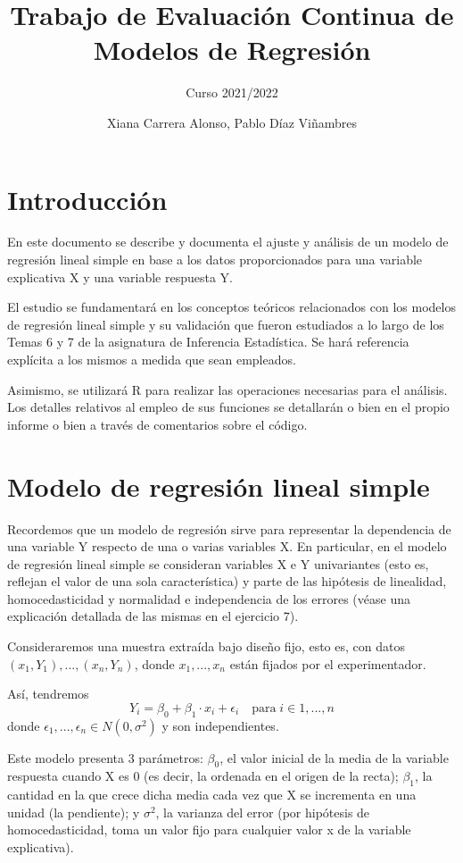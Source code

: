 \documentclass[
]{article}
\title{Trabajo de Evaluación Continua de Modelos de Regresión}
\subtitle{Curso 2021/2022}
\author{Xiana Carrera Alonso, Pablo Díaz Viñambres}
\date{}
\begin{document}
\maketitle

\hypertarget{introducciuxf3n}{%
\section{Introducción}\label{introducciuxf3n}}

En este documento se describe y documenta el ajuste y análisis de un
modelo de regresión lineal simple en base a los datos proporcionados
para una variable explicativa X y una variable respuesta Y.

El estudio se fundamentará en los conceptos teóricos relacionados con
los modelos de regresión lineal simple y su validación que fueron
estudiados a lo largo de los Temas 6 y 7 de la asignatura de Inferencia
Estadística. Se hará referencia explícita a los mismos a medida que sean
empleados.

Asimismo, se utilizará R para realizar las operaciones necesarias para
el análisis. Los detalles relativos al empleo de sus funciones se
detallarán o bien en el propio informe o bien a través de comentarios
sobre el código.

\hypertarget{modelo-de-regresiuxf3n-lineal-simple}{%
\section{Modelo de regresión lineal
simple}\label{modelo-de-regresiuxf3n-lineal-simple}}

Recordemos que un modelo de regresión sirve para representar la
dependencia de una variable Y respecto de una o varias variables X. En
particular, en el modelo de regresión lineal simple se consideran
variables X e Y univariantes (esto es, reflejan el valor de una sola
característica) y parte de las hipótesis de linealidad, homocedasticidad
y normalidad e independencia de los errores (véase una explicación
detallada de las mismas en el ejercicio 7).

Consideraremos una muestra extraída bajo diseño fijo, esto es, con datos
\((x_1, Y_1), ..., (x_n, Y_n)\), donde \(x_1, ..., x_n\) están fijados
por el experimentador.

Así, tendremos \[
Y_i = \beta_0 + \beta_1 \cdot x_i + \epsilon_i  \quad \text{para}\; i \in {1,...,n}
\] donde \(\epsilon_1,...,\epsilon_n \in N(0, \sigma^2)\) y son
independientes.

Este modelo presenta 3 parámetros: \(\beta_0\), el valor inicial de la
media de la variable respuesta cuando X es 0 (es decir, la ordenada en
el origen de la recta); \(\beta_1\), la cantidad en la que crece dicha
media cada vez que X se incrementa en una unidad (la pendiente); y
\(\sigma^2\), la varianza del error (por hipótesis de homocedasticidad,
toma un valor fijo para cualquier valor x de la variable explicativa).
\end{document}
